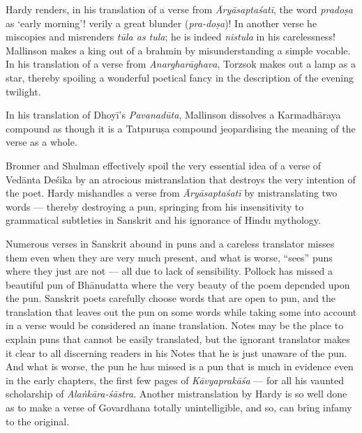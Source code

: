 Hardy renders, in his translation of a verse from \textsl{Āryāsaptaśatī}, the word \textsl{pradoṣa} as ‘early morning’! verily a great blunder (\textsl{pra-doṣa})! In another verse he miscopies and misrenders \textsl{tūla as tula}; he is indeed \textsl{nistula} in his carelessness! Mallinson makes a king out of a brahmin by misunderstanding a simple vocable. In his translation of a verse from \textsl{Anargharāghava}, Torzsok makes out a lamp as a star, thereby spoiling a wonderful poetical fancy in the description of the evening twilight.

\eject

In his translation of Dhoyī’s \textsl{Pavanadūta}, Mallinson dissolves a Karmadhāraya compound as though it is a Tatpuruṣa compound jeopardising the meaning of the verse as a whole.

Bronner and Shulman effectively spoil the very essential idea of a verse of Vedānta Deśika by an atrocious mistranslation that destroys the very intention of the poet. Hardy mishandles a verse from \textsl{Āryāsaptaśatī} by mistranslating two words --- thereby destroying a pun, springing from his insensitivity to grammatical subtleties in Sanskrit and his ignorance of Hindu mythology.

Numerous verses in Sanskrit abound in puns and a careless translator misses them even when they are very much present, and what is worse, “sees” puns where they just are not --- all due to lack of sensibility. Pollock has missed a beautiful pun of Bhānudatta where the very beauty of the poem depended upon the pun. Sanskrit poets carefully choose words that are open to pun, and the translation that leaves out the pun on some words while taking some into account in a verse would be considered an inane translation. Notes may be the place to explain puns that cannot be easily translated, but the ignorant translator makes it clear to all discerning readers in his Notes that he is just unaware of the pun. And what is worse, the pun he has missed is a pun that is much in evidence even in the early chapters, the first few pages of \textsl{Kāvyaprakāśa} --- for all his vaunted scholarship of \textsl{Alaṅkāra-śāstra}. Another mistranslation by Hardy is so well done as to make a verse of Govardhana totally unintelligible, and so, can bring infamy to the original.

